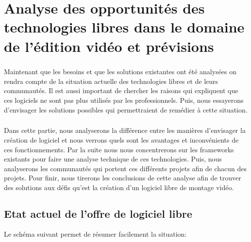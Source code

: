 \chapter{Analyse des opportunités des technologies libres dans le
domaine de l'édition vidéo et prévisions}

\minitoc \newpage

\paragraph{}

Maintenant que les besoins et que les solutions existantes ont été
analysées on rendra compte de la situation actuelle des technologies
libres et de leurs communautés. Il est aussi important de chercher
les raisons qui expliquent que ces logiciels ne sont pas plus utilisés
par les professionnels. Puis, nous essayerons d'envisager les solutions
possibles qui permettraient de remédier à cette situation.

\paragraph{}

Dans cette partie, nous analyserons la différence entre les manières
d'envisager la création de logiciel et nous verrons quels sont les
avantages et inconvénients de ces fonctionnements. Par la suite nous
nous concentrerons sur les frameworks existants pour faire une analyse
technique de ces technologies. Puis, nous analyserons les communautés
qui portent ces différents projets afin %
 de chacun des projets.  Pour finir, nous tirerons les
conclusions de cette analyse afin de trouver des solutions aux défis
qu'est la création d'un logiciel libre de montage vidéo.

\newpage

\section {Etat actuel de l'offre de logiciel libre}

Le schéma suivant permet de résumer facilement la situation:

